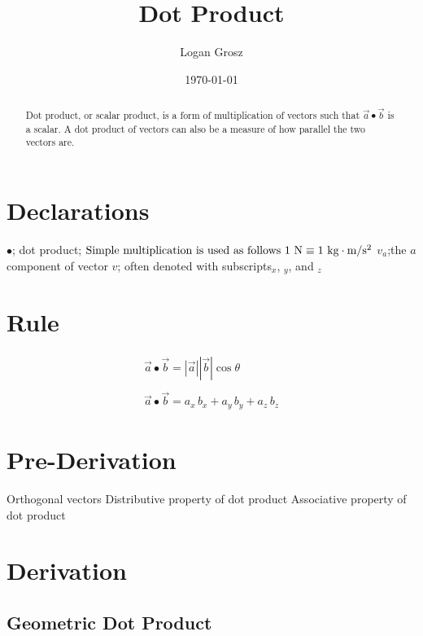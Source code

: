 \documentclass{article}
\begin{document}
	
\author{Logan Grosz}
\title{Dot Product}
\date{\today}

\maketitle

\begin{abstract}
	Dot product, or scalar product, is a form of multiplication of vectors such that $\vec{a} \bullet \vec{b}$ is a scalar. A dot product of vectors can also be a measure of how parallel the two vectors are.
\end{abstract}

\section{Declarations}

$\bullet$; dot product; $\text{Simple multiplication is used as follows } 1\text{ N}\equiv1\text{ kg}\cdot\text{m/s\textsuperscript{2}}$
$v_a$;the $a$ component of vector $v$; often denoted with subscripts$_x$, $_y$, and $_z$

\section{Rule}

\begin{gather*}
	\vec{a}\bullet\vec{b}=|\vec{a}||\vec{b}|\cos\theta\\
	\\
	\vec{a}\bullet\vec{b}=a_x\,b_x+a_y\,b_y+a_z\,b_z
\end{gather*}

\section{Pre-Derivation}
Orthogonal vectors
Distributive property of dot product
Associative property of dot product

\section{Derivation}

\subsection{Geometric Dot Product}
\end{document}
